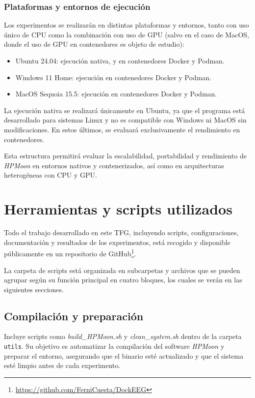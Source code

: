 \subsubsection{Plataformas y entornos de ejecución}

Los experimentos se realizarán en distintas plataformas y entornos, tanto con uso único de CPU como la combinación con uso de GPU (salvo en el caso de MacOS, donde el uso de GPU en contenedores es objeto de estudio):

\begin{itemize}
    \item Ubuntu 24.04: ejecución nativa, y en contenedores Docker y Podman.
    \item Windows 11 Home: ejecución en contenedores Docker y Podman.
    \item MacOS Sequoia 15.5: ejecución en contenedores Docker y Podman.
\end{itemize}

La ejecución nativa se realizará únicamente en Ubuntu, ya que el programa está desarrollado para sistemas Linux y no es compatible con Windows ni MacOS sin modificaciones. En estos últimos, se evaluará exclusivamente el rendimiento en contenedores.

Esta estructura permitirá evaluar la escalabilidad, portabilidad y rendimiento de \textit{HPMoon} en entornos nativos y contenerizados, así como en arquitecturas heterogéneas con CPU y GPU.

\section{Herramientas y scripts utilizados}\label{sec:herramientas_scripts}

Todo el trabajo desarrollado en este TFG, incluyendo scripts, configuraciones, documentación y resultados de los experimentos, está recogido y disponible públicamente en un repositorio de GitHub\footnote{\url{https://github.com/FerniCuesta/DockEEG}}.

La carpeta de scripts está organizada en subcarpetas y archivos que se pueden agrupar según su función principal en cuatro bloques, los cuales se verán en las siguientes secciones.

\subsection{Compilación y preparación}
Incluye scripts como \textit{build\_HPMoon.sh} y \textit{clean\_system.sh} dentro de la carpeta \texttt{utils}. Su objetivo es automatizar la compilación del software \textit{HPMoon} y preparar el entorno, asegurando que el binario esté actualizado y que el sistema esté limpio antes de cada experimento.

